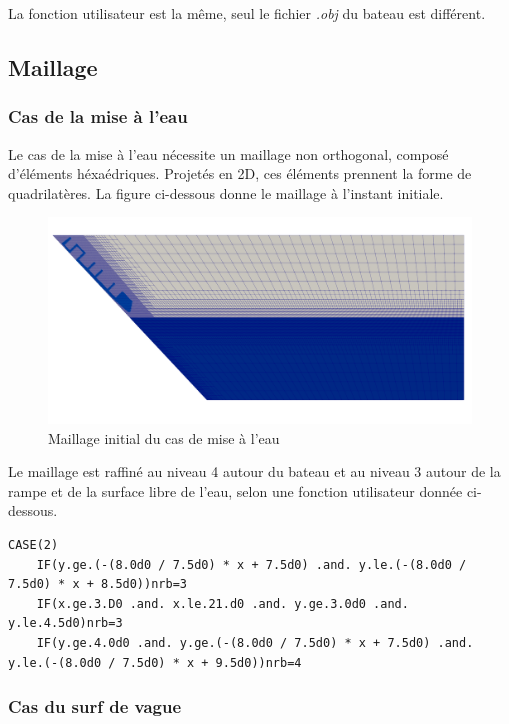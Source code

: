 \documentclass[../main.tex]{subfiles}
\begin{document}
La fonction utilisateur est la même, seul le fichier \textit{.obj} du bateau est différent.

\subsection{Maillage}

\subsubsection{Cas de la mise à l'eau}

Le cas de la mise à l'eau nécessite un maillage non orthogonal, composé d'éléments héxaédriques. Projetés en 2D, ces éléments prennent la forme de quadrilatères. La figure ci-dessous donne le maillage à l'instant initiale.

\begin{figure}[H]
    \centering
    \includegraphics[width=12cm]{IMAGES/part1/mesh_zephyr_lanching.png}
    \caption{Maillage initial du cas de mise à l'eau}
\end{figure}

Le maillage est raffiné au niveau 4 autour du bateau et au niveau 3 autour de la rampe et de la surface libre de l'eau, selon une fonction utilisateur donnée ci-dessous.
\begin{lstlisting}[style=f90, caption={Maillge utilisateur pour le cas de la mise à l'eau}, captionpos=b]
    CASE(2)
    IF(y.ge.(-(8.0d0 / 7.5d0) * x + 7.5d0) .and. y.le.(-(8.0d0 / 7.5d0) * x + 8.5d0))nrb=3
    IF(x.ge.3.D0 .and. x.le.21.d0 .and. y.ge.3.0d0 .and. y.le.4.5d0)nrb=3
    IF(y.ge.4.0d0 .and. y.ge.(-(8.0d0 / 7.5d0) * x + 7.5d0) .and. y.le.(-(8.0d0 / 7.5d0) * x + 9.5d0))nrb=4
\end{lstlisting}


\subsubsection{Cas du surf de vague}
\end{document}
